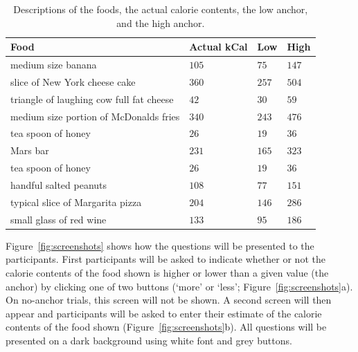 \documentclass[a4paper,doc,natbib]{apa6}
\begin{document}
\begin{table}[!h]
  \caption{Descriptions of the foods, the actual calorie contents, the low anchor, and the high anchor.} 
  \label{tab:descriptions} 
\begin{tabular}{p{7cm}p{2cm}p{2cm}p{2cm}}  
\hline
Food & Actual kCal & Low & High \\ 
\hline
medium size banana & $105$ & $75$ & $147$ \\ 
slice of New York cheese cake & $360$ & $257$ & $504$ \\ 
triangle of laughing cow full fat cheese & $42$ & $30$ & $59$ \\ 
medium size portion of McDonalds fries & $340$ & $243$ & $476$ \\ 
tea spoon of honey & $26$ & $19$ & $36$ \\ 
Mars bar & $231$ & $165$ & $323$ \\ 
tea spoon of honey & $26$ & $19$ & $36$ \\ 
handful salted peanuts & $108$ & $77$ & $151$ \\ 
typical slice of Margarita pizza & $204$ & $146$ & $286$ \\ 
small glass of red wine & $133$ & $95$ & $186$ \\ 
\hline
\end{tabular} 
\end{table} 

Figure~\ref{fig:screenshots} shows how the questions will be presented to the participants. First participants will be asked to indicate whether or not the calorie contents of the food shown is higher or lower than a given value (the anchor) by clicking one of two buttons (`more' or `less'; Figure~\ref{fig:screenshots}a). On no-anchor trials, this screen will not be shown. A second screen will then appear and participants will be asked to enter their estimate of the calorie contents of the food shown (Figure~\ref{fig:screenshots}b). All questions will be presented on a dark background using white font and grey buttons.
\end{document}
